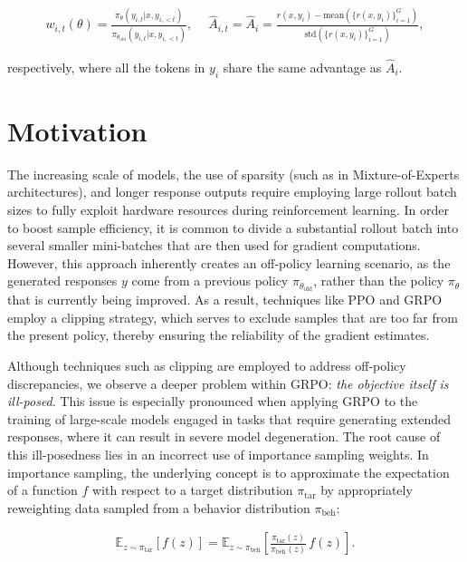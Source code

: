 \begin{align}
    w_{i,t}(\theta) = \frac{ \pi_{\theta} (y_{i,t} | x, y_{i,<t}) }{ \pi_{\theta_\text{old}} (y_{i,t} | x, y_{i,<t}) }, \quad\ 
    \widehat{A}_{i,t} = \widehat{A}_i = \frac{ r(x, y_i) - \mathrm{mean}\left( \{ r(x, y_i) \}_{i=1}^G \right) }{ \mathrm{std}\left( \{ r(x, y_i) \}_{i=1}^G \right) },
\end{align}

respectively, where all the tokens in $y_i$ share the same advantage as $\widehat{A}_{i}$.

\section{Motivation}
\label{sec:motivation}

The increasing scale of models, the use of sparsity (such as in Mixture-of-Experts architectures), and longer response outputs require employing large rollout batch sizes to fully exploit hardware resources during reinforcement learning. In order to boost sample efficiency, it is common to divide a substantial rollout batch into several smaller mini-batches that are then used for gradient computations. However, this approach inherently creates an off-policy learning scenario, as the generated responses $y$ come from a previous policy $\pi_{\theta_\text{old}}$, rather than the policy $\pi_\theta$ that is currently being improved. As a result, techniques like PPO and GRPO employ a clipping strategy, which serves to exclude samples that are too far from the present policy, thereby ensuring the reliability of the gradient estimates.

Although techniques such as clipping are employed to address off-policy discrepancies, we observe a deeper problem within GRPO: \textit{the objective itself is ill-posed}. This issue is especially pronounced when applying GRPO to the training of large-scale models engaged in tasks that require generating extended responses, where it can result in severe model degeneration. The root cause of this ill-posedness lies in an incorrect use of importance sampling weights. In importance sampling, the underlying concept is to approximate the expectation of a function $f$ with respect to a target distribution $\pi_\text{tar}$ by appropriately reweighting data sampled from a behavior distribution $\pi_\text{beh}$:

\begin{align}
\mathbb{E}_{z \sim \pi_\text{tar}} \left[ f(z) \right] = \mathbb{E}_{z \sim \pi_\text{beh}} \left[ \frac{ \pi_\text{tar} (z) }{ \pi_\text{beh} (z)} \, f(z) \right].
\end{align}

